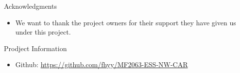 \documentclass[final,hyperref={pdfpagelabels=false}]{beamer}
\begin{document}
\begin{frame}[t]
\begin{columns}[t]
\begin{column}{.465\textwidth}

\begin{block}{Acknowledgments}

\begin{itemize}
\item We want to thank the project owners for their support they have given us under this project. 
\end{itemize}

\end{block}



\begin{block}{Prodject Information}

\begin{itemize}
\item Github: \href{https://github.com/fhyy/MF2063-ESS-NW-CAR}{https://github.com/fhyy/MF2063-ESS-NW-CAR}

\end{itemize}

\end{block}


\end{column} %

\begin{column}{.015\textwidth}\end{column} %

\end{columns} %

\end{frame} %
\end{document}
